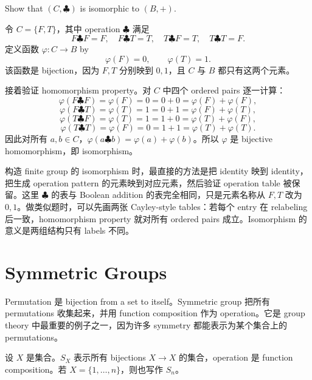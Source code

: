 \begin{exerciseblock}
Show that \((C,\clubsuit)\) is isomorphic to \((B,+)\).
\end{exerciseblock}

\begin{solution}
令 \(C=\{F,T\}\)，其中 operation \(\clubsuit\) 满足
\[
  F\clubsuit F=F,\quad F\clubsuit T=T,\quad T\clubsuit F=T,\quad T\clubsuit T=F.
\]
定义函数 \(\varphi:C\to B\) by
\[
  \varphi(F)=0,\qquad \varphi(T)=1.
\]
该函数是 bijection，因为 \(F,T\) 分别映到 \(0,1\)，且 \(C\) 与 \(B\) 都只有这两个元素。

接着验证 homomorphism property。对 \(C\) 中四个 ordered pairs 逐一计算：
\[
  \varphi(F\clubsuit F)=\varphi(F)=0=0+0=\varphi(F)+\varphi(F),
\]
\[
  \varphi(F\clubsuit T)=\varphi(T)=1=0+1=\varphi(F)+\varphi(T),
\]
\[
  \varphi(T\clubsuit F)=\varphi(T)=1=1+0=\varphi(T)+\varphi(F),
\]
\[
  \varphi(T\clubsuit T)=\varphi(F)=0=1+1=\varphi(T)+\varphi(T).
\]
因此对所有 \(a,b\in C\)，\(\varphi(a\clubsuit b)=\varphi(a)+\varphi(b)\)。所以 \(\varphi\) 是 bijective homomorphism，即 isomorphism。
\end{solution}

\begin{explanation}
构造 finite group 的 isomorphism 时，最直接的方法是把 identity 映到 identity，把生成 operation pattern 的元素映到对应元素，然后验证 operation table 被保留。这里 \(\clubsuit\) 的表与 Boolean addition 的表完全相同，只是元素名称从 \(F,T\) 改为 \(0,1\)。做类似题时，可以先画两张 Cayley-style tables：若每个 entry 在 relabeling 后一致，homomorphism property 就对所有 ordered pairs 成立。Isomorphism 的意义是两组结构只有 labels 不同。
\end{explanation}

\section{Symmetric Groups}

Permutation 是 bijection from a set to itself。Symmetric group 把所有 permutations 收集起来，并用 function composition 作为 operation。它是 group theory 中最重要的例子之一，因为许多 symmetry 都能表示为某个集合上的 permutations。

\begin{definition}
设 \(X\) 是集合。\(S_X\) 表示所有 bijections \(X\to X\) 的集合，operation 是 function composition。若 \(X=\{1,\ldots,n\}\)，则也写作 \(S_n\)。
\end{definition}

